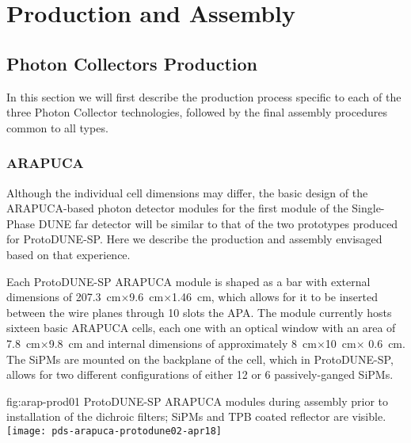 \section{Production and Assembly}
\label{sec:fdsp-pd-prod-assy}


\subsection{Photon Collectors Production}
\label{sec:fdsp-pd-prod-pc}

In this section we will first describe the production process specific to each of the three Photon Collector technologies, followed by the final assembly procedures common to all types. 


\subsubsection{ARAPUCA}
\label{ssec:fdsp-pd-pc-prod-arapuca}
Although the individual cell dimensions may differ, the basic design of the ARAPUCA-based photon detector modules for the first module of the Single-Phase DUNE far detector will be similar to that of the two prototypes produced for ProtoDUNE-SP. Here we describe the production and assembly envisaged based on that experience.

Each ProtoDUNE-SP ARAPUCA module is shaped as a bar with external dimensions of 
\SI{207.3}{cm}$\times$\SI{9.6}{cm}$\times$\SI{1.46}{cm}, which allows for it to be inserted between the wire planes through 10 slots the APA. The module currently hosts sixteen basic ARAPUCA cells, each one with an optical window with an area of \SI{7.8}{cm}$\times$\SI{9.8}{cm} and internal dimensions of approximately \SI{8}{cm}$\times$\SI{10}{cm}$\times$ \SI{0.6}{cm}. The SiPMs are mounted on the backplane of the cell, which in ProtoDUNE-SP, allows for  two different configurations of either 12 or 6 passively-ganged SiPMs.

\begin{dunefigure}{fig:arap-prod01}
{ProtoDUNE-SP ARAPUCA modules during assembly prior to installation of the dichroic filters; SiPMs and TPB coated reflector are visible.}
  \texttt{[image: pds-arapuca-protodune02-apr18]}
\end{dunefigure}

